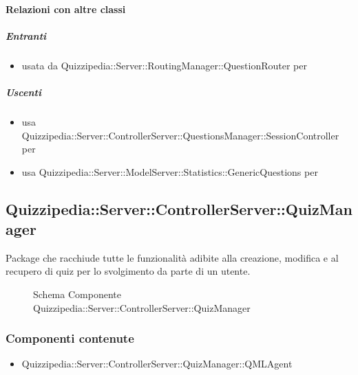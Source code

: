 \paragraph{Relazioni con altre classi}
\subparagraph{Entranti}
\begin{itemize}
\item usata da Quizzipedia::Server::RoutingManager::QuestionRouter per 
\end{itemize}
\subparagraph{Uscenti}
\begin{itemize}
\item usa Quizzipedia::Server::ControllerServer::QuestionsManager::SessionController per 
\item usa Quizzipedia::Server::ModelServer::Statistics::GenericQuestions per 
\end{itemize}
\subsection{Quizzipedia::Server::ControllerServer::QuizManager}
Package che racchiude tutte le funzionalità adibite alla creazione, modifica e al recupero di quiz per lo svolgimento da parte di un utente.
\begin{figure}[H]
\centering
\noindent{}
\caption[Schema Componente Quizzipedia::Server::ControllerServer::QuizManager]{Schema Componente Quizzipedia::Server::ControllerServer::QuizManager}
\end{figure}
\subsubsection{Componenti contenute}
\begin{itemize}
\item Quizzipedia::Server::ControllerServer::QuizManager::QMLAgent
\end{itemize}
